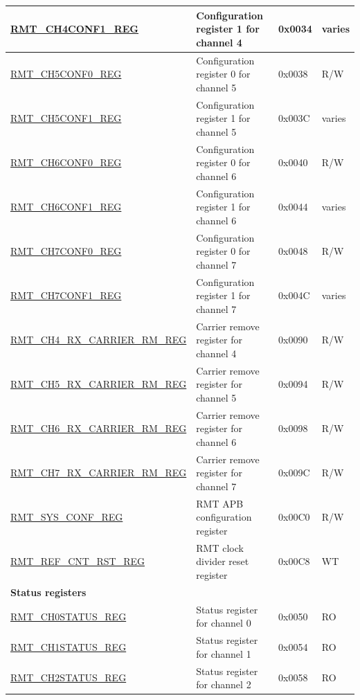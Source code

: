 \begin{longtable}{ | p{5.5cm} | p{6.9cm} | p{1.3cm} | p{1.8cm} | }
\hyperref[regdesc:RMTCHMCONF1REG]{RMT\_CH4CONF1\_REG} & Configuration register 1 for channel 4 & 0x0034 & varies \\ \hline
\hyperref[regdesc:RMTCHMCONF0REG]{RMT\_CH5CONF0\_REG} & Configuration register 0 for channel 5 & 0x0038 & R/W \\ \hline
\hyperref[regdesc:RMTCHMCONF1REG]{RMT\_CH5CONF1\_REG} & Configuration register 1 for channel 5 & 0x003C & varies \\ \hline
\hyperref[regdesc:RMTCHMCONF0REG]{RMT\_CH6CONF0\_REG} & Configuration register 0 for channel 6 & 0x0040 & R/W \\ \hline
\hyperref[regdesc:RMTCHMCONF1REG]{RMT\_CH6CONF1\_REG} & Configuration register 1 for channel 6 & 0x0044 & varies \\ \hline
\hyperref[regdesc:RMTCHMCONF0REG]{RMT\_CH7CONF0\_REG} & Configuration register 0 for channel 7 & 0x0048 & R/W \\ \hline
\hyperref[regdesc:RMTCHMCONF1REG]{RMT\_CH7CONF1\_REG} & Configuration register 1 for channel 7 & 0x004C & varies \\ \hline
\hyperref[regdesc:RMTCHMRXCARRIERRMREG]{RMT\_CH4\_RX\_CARRIER\_RM\_REG} & Carrier remove register for channel 4 & 0x0090 & R/W \\ \hline
\hyperref[regdesc:RMTCHMRXCARRIERRMREG]{RMT\_CH5\_RX\_CARRIER\_RM\_REG} & Carrier remove register for channel 5  & 0x0094 & R/W \\ \hline
\hyperref[regdesc:RMTCHMRXCARRIERRMREG]{RMT\_CH6\_RX\_CARRIER\_RM\_REG} & Carrier remove register for channel 6  & 0x0098 & R/W \\ \hline
\hyperref[regdesc:RMTCHMRXCARRIERRMREG]{RMT\_CH7\_RX\_CARRIER\_RM\_REG} & Carrier remove register for channel 7  & 0x009C & R/W \\ \hline
\hyperref[regdesc:RMTSYSCONFREG]{RMT\_SYS\_CONF\_REG} & RMT APB configuration register & 0x00C0 & R/W \\ \hline
\hyperref[regdesc:RMTREFCNTRSTREG]{RMT\_REF\_CNT\_RST\_REG} & RMT clock divider reset register & 0x00C8 & WT \\ \hline
\multicolumn{4}{|l|}{\textbf{Status registers}} \\ \hline
\hyperref[regdesc:RMTCHNSTATUSREG]{RMT\_CH0STATUS\_REG} & Status register for channel 0 & 0x0050 & RO \\ \hline
\hyperref[regdesc:RMTCHNSTATUSREG]{RMT\_CH1STATUS\_REG} & Status register for channel 1 & 0x0054 & RO \\ \hline
\hyperref[regdesc:RMTCHNSTATUSREG]{RMT\_CH2STATUS\_REG} & Status register for channel 2 & 0x0058 & RO \\ \hline

\end{longtable}
